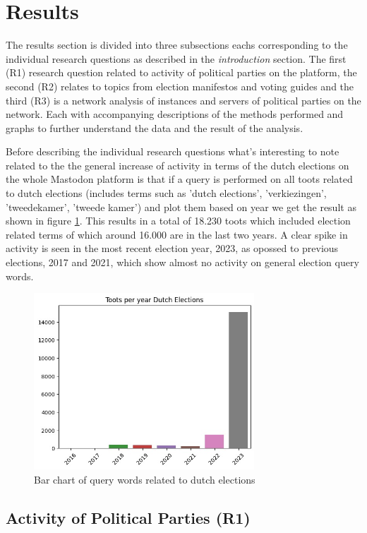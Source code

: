 \section{Results}

The results section is divided into three subsections eachs corresponding to the individual research questions as described in the \textit{introduction} section. The first (R1) research question related to activity of political parties on the platform, the second (R2) relates to topics from election manifestos and voting guides and the third (R3) is a network analysis of instances and servers of political parties on the network. Each with accompanying descriptions of the methods performed and graphs to further understand the data and the result of the analysis.

Before describing the individual research questions what's interesting to note related to the the general increase of activity in terms of the dutch elections on the whole Mastodon platform is that if a query is performed on all toots related to dutch elections (includes terms such as 'dutch elections', 'verkiezingen', 'tweedekamer', 'tweede kamer') and plot them based on year we get the result as shown in figure \ref{fig:electionstotal}. This results in a total of 18.230 toots which included election related terms of which around 16.000 are in the last two years. A clear spike in activity is seen in the most recent election year, 2023, as opossed to previous elections, 2017 and 2021, which show almost no activity on general election query words.


\begin{figure}[h]
  \centering
  \includegraphics[width=3.25in]{media/dutch-elections-mastodon.jpeg}
  \caption{Bar chart of query words related to dutch elections}
  \label{fig:electionstotal}
\end{figure}

\subsection{Activity of Political Parties (R1)}


